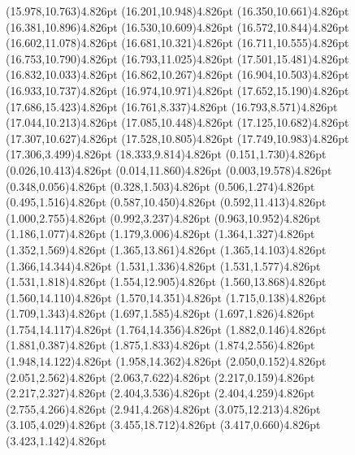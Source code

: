 \documentclass[10pt]{article}
\begin{document}
{{\qdisk(15.978,10.763){4.826pt}%
\qdisk(16.201,10.948){4.826pt}%
\qdisk(16.350,10.661){4.826pt}%
\qdisk(16.381,10.896){4.826pt}%
\qdisk(16.530,10.609){4.826pt}%
\qdisk(16.572,10.844){4.826pt}%
\qdisk(16.602,11.078){4.826pt}%
\qdisk(16.681,10.321){4.826pt}%
\qdisk(16.711,10.555){4.826pt}%
\qdisk(16.753,10.790){4.826pt}%
\qdisk(16.793,11.025){4.826pt}%
\qdisk(17.501,15.481){4.826pt}%
\qdisk(16.832,10.033){4.826pt}%
\qdisk(16.862,10.267){4.826pt}%
\qdisk(16.904,10.503){4.826pt}%
\qdisk(16.933,10.737){4.826pt}%
\qdisk(16.974,10.971){4.826pt}%
\qdisk(17.652,15.190){4.826pt}%
\qdisk(17.686,15.423){4.826pt}%
\qdisk(16.761,8.337){4.826pt}%
\qdisk(16.793,8.571){4.826pt}%
\qdisk(17.044,10.213){4.826pt}%
\qdisk(17.085,10.448){4.826pt}%
\qdisk(17.125,10.682){4.826pt}%
\qdisk(17.307,10.627){4.826pt}%
\qdisk(17.528,10.805){4.826pt}%
\qdisk(17.749,10.983){4.826pt}%
\qdisk(17.306,3.499){4.826pt}%
\qdisk(18.333,9.814){4.826pt}%
\dummycolor
\qdisk(0.151,1.730){4.826pt}%
\qdisk(0.026,10.413){4.826pt}%
\qdisk(0.014,11.860){4.826pt}%
\qdisk(0.003,19.578){4.826pt}%
\qdisk(0.348,0.056){4.826pt}%
\qdisk(0.328,1.503){4.826pt}%
\qdisk(0.506,1.274){4.826pt}%
\qdisk(0.495,1.516){4.826pt}%
\qdisk(0.587,10.450){4.826pt}%
\qdisk(0.592,11.413){4.826pt}%
\qdisk(1.000,2.755){4.826pt}%
\qdisk(0.992,3.237){4.826pt}%
\qdisk(0.963,10.952){4.826pt}%
\qdisk(1.186,1.077){4.826pt}%
\qdisk(1.179,3.006){4.826pt}%
\qdisk(1.364,1.327){4.826pt}%
\qdisk(1.352,1.569){4.826pt}%
\qdisk(1.365,13.861){4.826pt}%
\qdisk(1.365,14.103){4.826pt}%
\qdisk(1.366,14.344){4.826pt}%
\qdisk(1.531,1.336){4.826pt}%
\qdisk(1.531,1.577){4.826pt}%
\qdisk(1.531,1.818){4.826pt}%
\qdisk(1.554,12.905){4.826pt}%
\qdisk(1.560,13.868){4.826pt}%
\qdisk(1.560,14.110){4.826pt}%
\qdisk(1.570,14.351){4.826pt}%
\qdisk(1.715,0.138){4.826pt}%
\qdisk(1.709,1.343){4.826pt}%
\qdisk(1.697,1.585){4.826pt}%
\qdisk(1.697,1.826){4.826pt}%
\qdisk(1.754,14.117){4.826pt}%
\qdisk(1.764,14.356){4.826pt}%
\qdisk(1.882,0.146){4.826pt}%
\qdisk(1.881,0.387){4.826pt}%
\qdisk(1.875,1.833){4.826pt}%
\qdisk(1.874,2.556){4.826pt}%
\qdisk(1.948,14.122){4.826pt}%
\qdisk(1.958,14.362){4.826pt}%
\qdisk(2.050,0.152){4.826pt}%
\qdisk(2.051,2.562){4.826pt}%
\qdisk(2.063,7.622){4.826pt}%
\qdisk(2.217,0.159){4.826pt}%
\qdisk(2.217,2.327){4.826pt}%
\qdisk(2.404,3.536){4.826pt}%
\qdisk(2.404,4.259){4.826pt}%
\qdisk(2.755,4.266){4.826pt}%
\qdisk(2.941,4.268){4.826pt}%
\qdisk(3.075,12.213){4.826pt}%
\qdisk(3.105,4.029){4.826pt}%
\qdisk(3.455,18.712){4.826pt}%
\qdisk(3.417,0.660){4.826pt}%
\qdisk(3.423,1.142){4.826pt}%
}}
\end{document}

